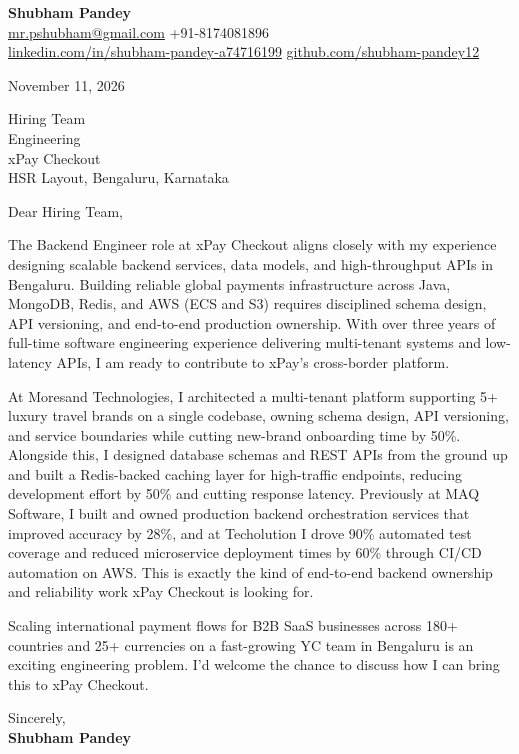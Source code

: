 \documentclass[a4paper,11pt]{article}
\begin{document}
\textbf{\Large Shubham Pandey}\\
\href{mailto:mr.pshubham@gmail.com}{mr.pshubham@gmail.com} \quad +91-8174081896\\
\href{https://www.linkedin.com/in/shubham-pandey-a74716199/}{linkedin.com/in/shubham-pandey-a74716199} \quad
\href{https://github.com/shubham-pandey12}{github.com/shubham-pandey12}

\vspace{1em}
November 11, 2026

\vspace{1em}
Hiring Team\\
Engineering\\
xPay Checkout\\
HSR Layout, Bengaluru, Karnataka

\vspace{1em}
Dear Hiring Team,

The Backend Engineer role at xPay Checkout aligns closely with my experience designing scalable backend services, data models, and high-throughput APIs in Bengaluru. Building reliable global payments infrastructure across Java, MongoDB, Redis, and AWS (ECS and S3) requires disciplined schema design, API versioning, and end-to-end production ownership. With over three years of full-time software engineering experience delivering multi-tenant systems and low-latency APIs, I am ready to contribute to xPay's cross-border platform.

At Moresand Technologies, I architected a multi-tenant platform supporting 5+ luxury travel brands on a single codebase, owning schema design, API versioning, and service boundaries while cutting new-brand onboarding time by 50\%. Alongside this, I designed database schemas and REST APIs from the ground up and built a Redis-backed caching layer for high-traffic endpoints, reducing development effort by 50\% and cutting response latency. Previously at MAQ Software, I built and owned production backend orchestration services that improved accuracy by 28\%, and at Techolution I drove 90\% automated test coverage and reduced microservice deployment times by 60\% through CI/CD automation on AWS. This is exactly the kind of end-to-end backend ownership and reliability work xPay Checkout is looking for.

Scaling international payment flows for B2B SaaS businesses across 180+ countries and 25+ currencies on a fast-growing YC team in Bengaluru is an exciting engineering problem. I'd welcome the chance to discuss how I can bring this to xPay Checkout.

\vspace{1em}
Sincerely,\\[0.5em]
\textbf{Shubham Pandey}
\end{document}
